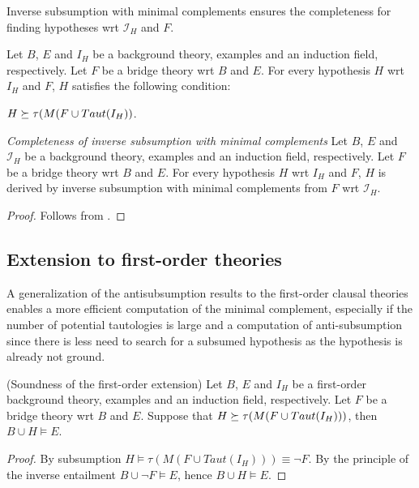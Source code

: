 Inverse subsumption with minimal complements ensures the completeness for finding
hypotheses wrt $\mathcal{I}_H$ and $F$.

\begin{lemma}\label{yamamoto2012inverseLemma2}\cite{yamamoto2012inverse}
Let $B$, $E$ and $I_H$ be a background theory, examples and an induction field,
respectively. Let $F$ be a bridge theory wrt $B$ and $E$. For every hypothesis $H$ wrt $I_H$ and $F$, $H$ satisfies the following condition:

$H \succeq \tau(M(F \cup Taut(I_H))$.
\end{lemma}

\begin{thm}\emph{Completeness of inverse subsumption with minimal complements} Let $B$, $E$ and $\mathcal{I}_H$ be a background theory, examples and an induction field,
respectively. Let $F$ be a bridge theory wrt $B$ and $E$. For every hypothesis $H$ wrt $I_H$ and $F$,
$H$ is derived by inverse subsumption with minimal complements from $F$ wrt $\mathcal{I}_H$.
\end{thm}
\begin{proof}
Follows from .
\end{proof}

\subsection{Extension to first-order theories}
A generalization of the antisubsumption results to the first-order clausal theories enables a more efficient computation of the minimal complement, especially if the number of potential tautologies is large and a computation of anti-subsumption since there is less need to search for a subsumed hypothesis as the hypothesis is already not ground.

\begin{proposition}\label{soundness_first_order_extension}(Soundness of the first-order extension)
Let $B$, $E$ and $I_H$ be a first-order background theory, examples and an induction field, respectively. Let $F$ be a bridge theory wrt $B$ and $E$. Suppose that $H \succeq \tau(M(F \cup Taut(I_H)))$, then $B \cup H \models E$.
\end{proposition}
\begin{proof}
By subsumption $H \models \tau(M(F \cup Taut(I_H))) \equiv \neg F$. By the principle of the inverse entailment $B \cup \neg F \models E$, hence
$B \cup H \models E$.
\end{proof}

